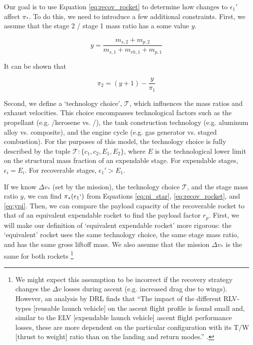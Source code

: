 \documentclass[conf]{new-aiaa}
\begin{document}
Our goal is to use Equation \ref{eq:recov_rocket} to determine how changes to $\epsilon_1'$ affect $\pi_*$. To do this, we need to introduce a few additional constraints. First, we assume that the stage 2 / stage 1 mass ratio has a some value $y$.

\begin{equation}
y = \frac{m_{s,2} + m_{p,2}}{m_{s,1} + m_{rh,1} + m_{p,1}}
\end{equation}

It can be shown that

\begin{equation}
\label{eq:ypi}
\pi_2 = (y + 1) - \frac{y}{\pi_1}
\end{equation}

Second, we define a `technology choice', $\mathcal{T}$, which influences the mass ratios and exhaust velocities. This choice encompasses technological factors such as the propellant (e.g. /kerosene vs. /), the tank construction technology (e.g. aluminum alloy vs. composite), and the engine cycle (e.g. gas generator vs. staged combustion). For the purposes of this model, the technology choice is fully described by the tuple $\mathcal{T} : \{ c_1, c_2, E_1, E_2 \}$, where $E$ is the technological lower limit on the structural mass fraction of an expendable stage. For expendable stages, $\epsilon_i = E_i$. For recoverable stages, $\epsilon_1' > E_1$.

If we know $\Delta v_*$ (set by the mission), the technology choice $\mathcal{T}$, and the stage mass ratio $y$, we can find $\pi_*(\epsilon_1`)$ from Equations \ref{eq:pi_star}, \ref{eq:recov_rocket}, and \ref{eq:ypi}. Then, we can compare the payload capacity of the recoverable rocket to that of an equivalent expendable rocket to find the payload factor $r_p$. First, we will make our definition of `equivalent expendable rocket' more rigorous: the `equivalent' rocket uses the same technology choice, the same stage mass ratio, and has the same gross liftoff mass. We also assume that the mission $\Delta v_*$ is the same for both rockets \footnote{We might expect this assumption to be incorrect if the recovery strategy changes the $\Delta v$ losses during ascent (e.g. increased drag due to wings). However, an analysis by DRL finds that ``The impact of the different RLV-types [reusable launch vehicle] on the ascent flight profile is found small and, similar to the ELV [expendable launch vehicle] ascent flight performance losses, these are more dependent on the particular configuration with its T/W [thrust to weight] ratio than on the landing and return modes.'' \cite{Stappert2017}.}
\end{document}

